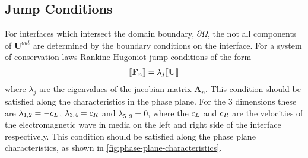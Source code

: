 %  
%  



\subsection{Jump Conditions}
For interfaces which intersect the domain boundary, $\partial \Omega$, the not all components of $\mathbf{U}^{out}$ are determined by the boundary conditions on the interface. For a system of conservation laws Rankine-Hugoniot jump conditions of the form
\begin{align}
\llbracket  \mathbf{F}_n  \rrbracket = \lambda_j \llbracket  \mathbf{U}  \rrbracket \label{eq:rankine-hugoniot}
\end{align}
where $\lambda_j$ are the eigenvalues of the jacobian matrix $\mathbf{A}_n$.
This condition should be satisfied along the characteristics in the phase plane.
For the 3 dimensions these are $ \lambda_{ 1,2 } = - c_{L} $, $
\lambda_{ 3,4 } = c_{R} $ and $\lambda_{5..9} = 0 $, where the
$c_{L}$ and $c_{R}$ are the velocities of the
electromagnetic wave in media on the left and right side of the interface
respectively. This condition should be satisfied along the phase plane
characteristics, as shown in \ref{fig:phase-plane-characteristics}.

